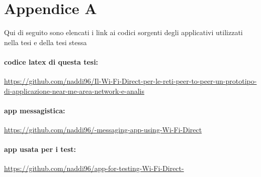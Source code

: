 \chapter*{Appendice A}

Qui di seguito sono elencati i link ai codici sorgenti degli applicativi utilizzati
nella tesi e della tesi stessa

\subsubsection{codice latex di questa tesi:}

\url{https://github.com/naddi96/Il-Wi-Fi-Direct-per-le-reti-peer-to-peer-un-prototipo-di-applicazione-near-me-area-network-e-analis}

\subsubsection{app messagistica:}

\url{https://github.com/naddi96/-messaging-app-using-Wi-Fi-Direct}

\subsubsection{app usata per i test:}

\url{https://github.com/naddi96/app-for-testing-Wi-Fi-Direct-}
